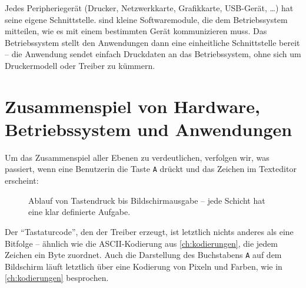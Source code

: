 Jedes Peripheriegerät (Drucker, Netzwerkkarte, Grafikkarte, USB-Gerät, \ldots) hat seine eigene Schnittstelle.  sind kleine Softwaremodule, die dem Betriebssystem mitteilen, wie es mit einem bestimmten Gerät kommunizieren muss. Das Betriebssystem stellt den Anwendungen dann eine einheitliche Schnittstelle bereit -- die Anwendung sendet einfach Druckdaten an das Betriebssystem, ohne sich um Druckermodell oder Treiber zu kümmern.

\section{Zusammenspiel von Hardware, Betriebssystem und Anwendungen}

Um das Zusammenspiel aller Ebenen zu verdeutlichen, verfolgen wir, was passiert, wenn eine Benutzerin die Taste \texttt{A} drückt und das Zeichen im Texteditor erscheint:

\begin{figure}[H]
    \centering
    \caption{Ablauf von Tastendruck bis Bildschirmausgabe -- jede Schicht hat eine klar definierte Aufgabe.}
    \label{fig:tastendruck}
\end{figure}

\begin{myattention}
    Der \enquote{Tastaturcode}, den der Treiber erzeugt, ist letztlich nichts anderes als eine Bitfolge -- ähnlich wie die ASCII-Kodierung aus \cref{ch:kodierungen}, die jedem Zeichen ein Byte zuordnet. Auch die Darstellung des Buchstabens \texttt{A} auf dem Bildschirm läuft letztlich über eine Kodierung von Pixeln und Farben, wie in \cref{ch:kodierungen} besprochen.
\end{myattention}

